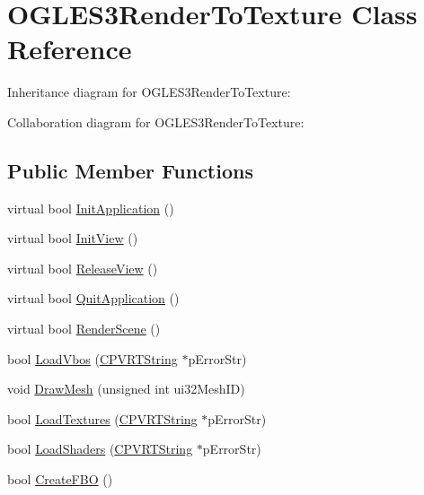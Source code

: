 \hypertarget{class_o_g_l_e_s3_render_to_texture}{\section{O\+G\+L\+E\+S3\+Render\+To\+Texture Class Reference}
\label{class_o_g_l_e_s3_render_to_texture}
}


Inheritance diagram for O\+G\+L\+E\+S3\+Render\+To\+Texture\+:


Collaboration diagram for O\+G\+L\+E\+S3\+Render\+To\+Texture\+:
\subsection*{Public Member Functions}
\begin{DoxyCompactItemize}
\item 
virtual bool \hyperlink{class_o_g_l_e_s3_render_to_texture_a193383fe366c177fc22ba1621aeb01fb}{Init\+Application} ()
\item 
virtual bool \hyperlink{class_o_g_l_e_s3_render_to_texture_aa38fb5d11c7384c5da4b7113d1ebe82b}{Init\+View} ()
\item 
virtual bool \hyperlink{class_o_g_l_e_s3_render_to_texture_a316ef790af28c0bb92ddeefbe2e6ebff}{Release\+View} ()
\item 
virtual bool \hyperlink{class_o_g_l_e_s3_render_to_texture_a5f679b2545e6363f8ccb1bc315b339cb}{Quit\+Application} ()
\item 
virtual bool \hyperlink{class_o_g_l_e_s3_render_to_texture_a4e1295869c4970d3afeae9fac0d41aa9}{Render\+Scene} ()
\item 
bool \hyperlink{class_o_g_l_e_s3_render_to_texture_a56ad6ceb05bf5a197e0ad4fdebd0d518}{Load\+Vbos} (\hyperlink{class_c_p_v_r_t_string}{C\+P\+V\+R\+T\+String} $\ast$p\+Error\+Str)
\item 
void \hyperlink{class_o_g_l_e_s3_render_to_texture_a64fba32a124d2ba5d161d88888757879}{Draw\+Mesh} (unsigned int ui32\+Mesh\+I\+D)
\item 
bool \hyperlink{class_o_g_l_e_s3_render_to_texture_a1a9322b39c812a063fe8ccf41564837b}{Load\+Textures} (\hyperlink{class_c_p_v_r_t_string}{C\+P\+V\+R\+T\+String} $\ast$p\+Error\+Str)
\item 
bool \hyperlink{class_o_g_l_e_s3_render_to_texture_a07a71ae7f4e29cda31d4a3863869bf02}{Load\+Shaders} (\hyperlink{class_c_p_v_r_t_string}{C\+P\+V\+R\+T\+String} $\ast$p\+Error\+Str)
\item 
bool \hyperlink{class_o_g_l_e_s3_render_to_texture_a859d587020381ddbac554693c44bab56}{Create\+F\+B\+O} ()
\end{DoxyCompactItemize}


